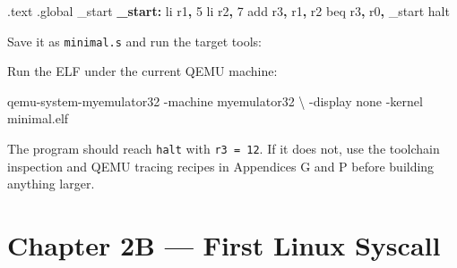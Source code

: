 \documentclass[
  oneside,
  openany]{book}
\newenvironment{Shaded}{\begin{snugshade}}{\end{snugshade}}
\newcommand{\AttributeTok}[1]{\textcolor[rgb]{0.13,0.29,0.53}{#1}}
\newcommand{\BuiltInTok}[1]{#1}
\newcommand{\DataTypeTok}[1]{\textcolor[rgb]{0.13,0.29,0.53}{#1}}
\newcommand{\DecValTok}[1]{\textcolor[rgb]{0.00,0.00,0.81}{#1}}
\newcommand{\ExtensionTok}[1]{#1}
\newcommand{\FunctionTok}[1]{\textcolor[rgb]{0.13,0.29,0.53}{\textbf{#1}}}
\newcommand{\NormalTok}[1]{#1}
\newcommand{\OperatorTok}[1]{\textcolor[rgb]{0.81,0.36,0.00}{\textbf{#1}}}
\newcommand{\VariableTok}[1]{\textcolor[rgb]{0.00,0.00,0.00}{#1}}
\begin{document}
\begin{Shaded}
\begin{Highlighting}[]
\NormalTok{.text}
\NormalTok{.global \_start}
\FunctionTok{\_start:}
\NormalTok{        li   r1}\OperatorTok{,} \DecValTok{5}
\NormalTok{        li   r2}\OperatorTok{,} \DecValTok{7}
        \BuiltInTok{add}\NormalTok{  r3}\OperatorTok{,}\NormalTok{ r1}\OperatorTok{,}\NormalTok{ r2}
\NormalTok{        beq  r3}\OperatorTok{,}\NormalTok{ r0}\OperatorTok{,}\NormalTok{ \_start}
\NormalTok{        halt}
\end{Highlighting}
\end{Shaded}

Save it as \texttt{minimal.s} and run the target tools:

\begin{Shaded}
\end{Shaded}

Run the ELF under the current QEMU machine:

\begin{Shaded}
\begin{Highlighting}[]
\ExtensionTok{qemu{-}system{-}myemulator32} \AttributeTok{{-}machine}\NormalTok{ myemulator32 }\DataTypeTok{\textbackslash{}}
  \AttributeTok{{-}display}\NormalTok{ none }\AttributeTok{{-}kernel}\NormalTok{ minimal.elf}
\end{Highlighting}
\end{Shaded}

The program should reach \texttt{halt} with \texttt{r3\ =\ 12}. If it
does not, use the toolchain inspection and QEMU tracing recipes in
Appendices G and P before building anything larger.

\hypertarget{chapter-2b-first-linux-syscall}{%
\chapter{Chapter 2B --- First Linux
Syscall}\label{chapter-2b-first-linux-syscall}}
\end{document}

